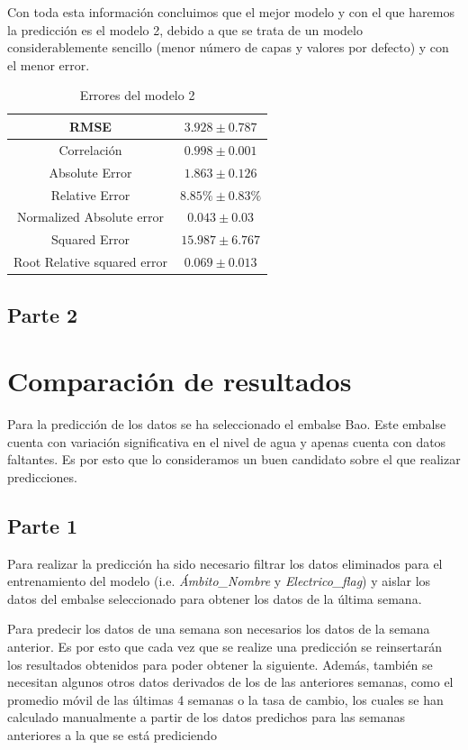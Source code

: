 \documentclass[12pt]{report} %
\begin{document}
    Con toda esta información concluimos que el mejor modelo y con el que haremos la predicción es el modelo 2, debido a que se trata de un modelo considerablemente sencillo (menor número de capas y valores por defecto) y con el menor error.

\begin{table}[H]
\begin{center}
\begin{tabular}{|c|c|}
    \hline
    RMSE & $3.928\pm0.787$\\ 
    \hline
    Correlación & $0.998\pm 0.001$\\
    \hline
    Absolute Error & $1.863\pm0.126$\\
    \hline
    Relative Error & $8.85\%\pm 0.83\%$\\
    \hline
    Normalized Absolute error & $0.043\pm0.03$\\
    \hline
    Squared Error & $15.987\pm 6.767$\\ 
    \hline
    Root Relative squared error & $0.069 \pm 0.013$\\
    \hline
\end{tabular}
\caption{Errores del modelo 2}
\end{center}
\end{table}
	\section{Parte 2}

\chapter{Comparación de resultados}
\label{chap:result-comparing}

Para la predicción de los datos se ha seleccionado el embalse Bao. Este embalse cuenta con variación significativa en el nivel de agua y apenas cuenta con datos faltantes. Es por esto que lo consideramos un buen candidato sobre el que realizar predicciones.

\section{Parte 1}
Para realizar la predicción ha sido necesario filtrar los datos eliminados para el entrenamiento del modelo (i.e. \textit{Ámbito\_Nombre} y \textit{Electrico\_flag}) y aislar los datos del embalse seleccionado para obtener los datos de la última semana.

Para predecir los datos de una semana son necesarios los datos de la semana anterior. Es por esto que cada vez que se realize una predicción se reinsertarán los resultados obtenidos para poder obtener la siguiente. Además, también se necesitan algunos otros datos derivados de los de las anteriores semanas, como el promedio móvil de las últimas 4 semanas o la tasa de cambio, los cuales se han calculado manualmente a partir de los datos predichos para las semanas anteriores a la que se está prediciendo
\end{document}
